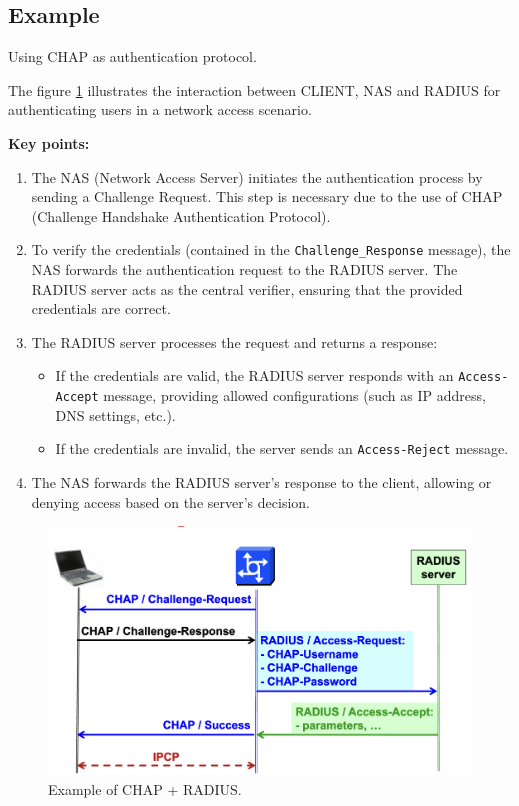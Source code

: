 \subsection{Example}
\begin{center}
    Using CHAP as authentication protocol.
\end{center}
The figure \ref{fig:chap_plus_radius} illustrates the interaction between CLIENT, NAS and RADIUS for authenticating users in a network access scenario. 


    \textbf{Key points:}
\begin{enumerate}
    \item The NAS (Network Access Server) initiates the authentication process by sending a Challenge Request. This step is necessary due to the use of CHAP (Challenge Handshake Authentication Protocol).
    \item To verify the credentials (contained in the \texttt{Challenge\_Response} message), the NAS forwards the authentication request to the RADIUS server. The RADIUS server acts as the central verifier, ensuring that the provided credentials are correct.
    \item The RADIUS server processes the request and returns a response:
    \begin{itemize}
        \item If the credentials are valid, the RADIUS server responds with an \texttt{Access-Accept} message, providing allowed configurations (such as IP address, DNS settings, etc.). 
        \item If the credentials are invalid, the server sends an \texttt{Access-Reject} message.
    \end{itemize}
        \item The NAS forwards the RADIUS server's response to the client, allowing or denying access based on the server's decision.
    \end{enumerate} 
    
   

    \begin{figure}[H]
        \centering
        \includegraphics[width=0.7\linewidth]{Images/NetSec/chap_plus_radius.png}
        \caption{Example of CHAP + RADIUS.}
        \label{fig:chap_plus_radius}
    \end{figure}



